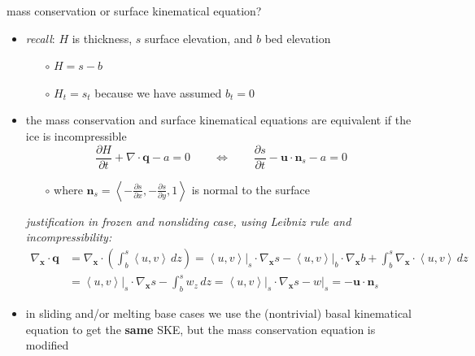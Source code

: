 \documentclass[10pt,hyperref,dvipsnames]{beamer}
\newcommand{\bn}{\mathbf{n}}
\newcommand{\bq}{\mathbf{q}}
\newcommand{\bx}{\mathbf{x}}
\newcommand{\bu}{\mathbf{u}}
\newcommand{\grad}{\nabla}
\newcommand{\Div}{\nabla\cdot}
\newcommand{\Divbx}{\nabla_{\bx}\cdot}
\begin{document}
\begin{frame}{mass conservation or surface kinematical equation?}
\begin{itemize}
\item \emph{recall}: $H$ is thickness, $s$ surface elevation, and $b$ bed elevation
    \begin{itemize}
    \item[$\circ$] $H=s-b$
    \item[$\circ$] $H_t=s_t$ because we have assumed $b_t=0$
    \end{itemize}
\item the mass conservation and surface kinematical equations are equivalent if the ice is incompressible
    $$\frac{\partial H}{\partial t} + \Div \bq - a = 0 \qquad \iff \qquad \frac{\partial s}{\partial t} - \bu \cdot \bn_s - a = 0$$
    \begin{itemize}
    \item[$\circ$] where $\bn_s = \left<-\frac{\partial s}{\partial x},-\frac{\partial s}{\partial y},1\right>$ is normal to the surface
    \end{itemize}

\bigskip
\scriptsize
\item[] \emph{justification in frozen and nonsliding case, using Leibniz rule and incompressibility:}
\begin{align*}
\Divbx \bq &= \Divbx \left(\int_b^s \left<u,v\right>\,dz\right) = \left<u,v\right>\big|_s \cdot \grad_{\bx} s - \left<u,v\right>\big|_b \cdot \grad_{\bx} b + \int_b^s \Divbx \left<u,v\right>\,dz \\
           &= \left<u,v\right>\big|_s \cdot \grad_{\bx} s - \int_b^s w_z\,dz = \left<u,v\right>\big|_s \cdot \grad_{\bx} s - w\big|_s = - \bu \cdot \bn_s
\end{align*}

\medskip
\normalsize
\item in sliding and/or melting base cases we use the (nontrivial) basal kinematical equation to get the \textbf{same} SKE, but the mass conservation equation is modified
\end{itemize}
\end{frame}
\end{document}
